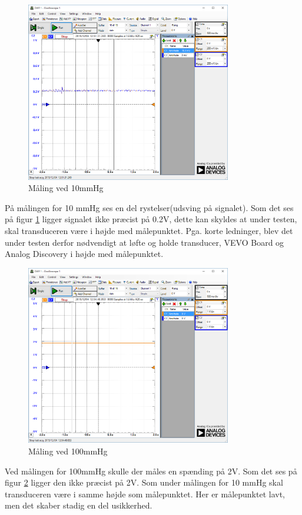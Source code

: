 \begin{figure}[H]
	\centering	\includegraphics[width=0.8\textwidth]{Figurer/10mmhg}
	\caption{Måling ved 10mmHg}
	\label{fig:vandtest_måling10}
\end{figure}
På målingen for 10 mmHg ses en del rystelser(udsving på signalet). Som det ses på figur \ref{fig:vandtest_måling10} ligger signalet ikke præcist på 0.2V, dette kan skyldes at under testen, skal transduceren være i højde med målepunktet. Pga. korte ledninger, blev det under testen derfor nødvendigt at løfte og holde transducer, VEVO Board og Analog Discovery i højde med målepunktet. 

\begin{figure}[H]
	\centering	\includegraphics[width=0.8\textwidth]{Figurer/100mmhg}
	\caption{Måling ved 100mmHg}
	\label{fig:vandtest_måling100}
\end{figure}
Ved målingen for 100mmHg skulle der måles en spænding på 2V. Som det ses på figur \ref{fig:vandtest_måling100} ligger den ikke præcist på 2V. Som under målingen for 10 mmHg skal transduceren være i samme højde som målepunktet. Her er målepunktet lavt, men det skaber stadig en del usikkerhed.

